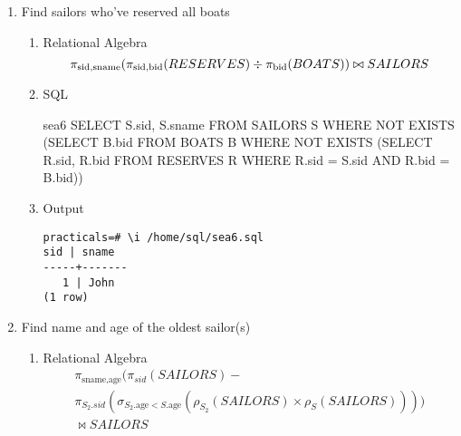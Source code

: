 \begin{enumerate}
\begin{enumerate}
	      \end{enumerate}

	\item Find sailors who've reserved all boats

	      \begin{enumerate}
		      \item Relational Algebra
		            \begin{equation*}
			            \pi_{\text{sid}, \text{sname}}
			            (\pi_{\text{sid}, \text{bid}}(RESERVES) \div \pi_{\text{bid}}(BOATS)) \\
			            \bowtie SAILORS
		            \end{equation*}

		      \item SQL

		            \begin{sqlQuery}{sea6}
                        SELECT S.sid, S.sname
                        FROM SAILORS S
                        WHERE NOT EXISTS
                              (SELECT B.bid
                              FROM BOATS B
                              WHERE NOT EXISTS
                                    (SELECT R.sid, R.bid
                                    FROM RESERVES R
                                    WHERE R.sid = S.sid
                                          AND R.bid = B.bid))
                  \end{sqlQuery}

		      \item Output
		            \begin{lstlisting}[style=output]
practicals=# \i /home/sql/sea6.sql
sid | sname 
-----+-------
   1 | John
(1 row)
                        \end{lstlisting}

	      \end{enumerate}

	\item Find name and age of the oldest sailor(s)

	      \begin{enumerate}
		      \item Relational Algebra
		            \begin{multline*}
			            \pi_{\text{sname}, \text{age}}(\pi_{sid}(SAILORS) - \\
			            \pi_{S_2.sid}(\sigma_{S_2.\text{age} < S.\text{age}}(\rho_{S_2}(SAILORS) \times \rho_{S}(SAILORS)))) \\
			            \bowtie SAILORS
		            \end{multline*}
		            \pagebreak


\end{enumerate}
\end{enumerate}
